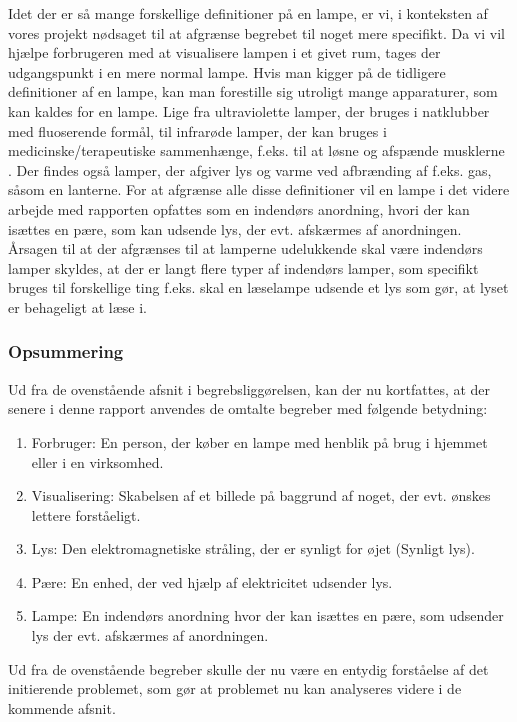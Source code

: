 Idet der er så mange forskellige definitioner på en lampe, er vi, i konteksten af vores projekt nødsaget til at afgrænse begrebet til noget mere specifikt. Da vi vil hjælpe forbrugeren med at visualisere lampen i et givet rum, tages der udgangspunkt i en mere normal lampe. Hvis man kigger på de tidligere definitioner af en lampe, kan man forestille sig utroligt mange apparaturer, som kan kaldes for en lampe. Lige fra ultraviolette lamper, der bruges i natklubber med fluoserende formål, til infrarøde lamper, der kan bruges i medicinske/terapeutiske sammenhænge, f.eks. til at løsne og afspænde musklerne \cite{lys_terapi}. Der findes også lamper, der afgiver lys og varme ved afbrænding af f.eks. gas, såsom en lanterne. For at afgrænse alle disse definitioner vil en lampe i det videre arbejde med rapporten opfattes som en indendørs anordning, hvori der kan isættes en pære, som kan udsende lys, der evt. afskærmes af anordningen. Årsagen til at der afgrænses til at lamperne udelukkende skal være indendørs lamper skyldes, at der er langt flere typer af indendørs lamper, som specifikt  bruges til forskellige ting f.eks. skal en læselampe udsende et lys som gør, at lyset er behageligt at læse i.


\subsubsection*{Opsummering}
Ud fra de ovenstående afsnit i begrebsliggørelsen, kan der nu kortfattes, at der senere i denne rapport anvendes de omtalte begreber med følgende betydning:
\begin{enumerate}
	\item Forbruger: En person, der køber en lampe med henblik på brug i hjemmet eller i en virksomhed.
	\item Visualisering: Skabelsen af et billede på baggrund af noget, der evt. ønskes lettere forståeligt.
	\item Lys: Den elektromagnetiske stråling, der er synligt for øjet (Synligt lys).
	\item Pære: En enhed, der ved hjælp af elektricitet udsender lys.
	\item Lampe: En indendørs anordning hvor der kan isættes en pære, som udsender lys der evt. afskærmes af anordningen.
\end{enumerate}
Ud fra de ovenstående begreber skulle der nu være en entydig forståelse af det initierende problemet, som gør at problemet nu kan analyseres videre i de kommende afsnit.





